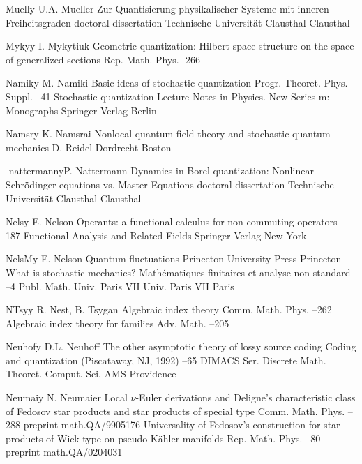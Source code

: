 \documentclass[11pt]{amsart}
\numberwithin{equation}{section}
\theoremstyle{remark}
\newcommand{\by}{\mathbf y}
\begin{document}
\begin{thebibliography}{199}
 Muell\by{ U.A. Mueller \book Zur Quantisierung physikalischer Systeme
mit inneren Freiheitsgraden \bookinfo doctoral dissertation \publ Technische
Universit\"at Clausthal \publaddr Clausthal }

 Myky\by{ I. Mykytiuk \paper Geometric quantization: Hilbert space
structure on the space of generalized sections \jour Rep. Math. Phys. 
 -266}

 Namik\by{ M. Namiki \paper Basic ideas of stochastic quantization \jour
Progr. Theoret. Phys. Suppl.   --41 \moreref \book
Stochastic quantization \bookinfo Lecture Notes in Physics. New Series m:
Monographs  \publ Springer-Verlag \publaddr Berlin }

 Namsr\by{ K. Namsrai \book Nonlocal quantum field theory and stochastic
quantum mechanics \publ D. Reidel \publaddr Dordrecht-Boston }

 -nattermann\by{P. Nattermann \book Dynamics in Borel quantization:
Nonlinear Schr\"odinger equations vs. Master Equations \bookinfo doctoral
dissertation \publ Technische Universit\"at Clausthal \publaddr Clausthal
}

 Nels\by{ E. Nelson \paper Operants: a functional calculus for
non-commuting operators --187 \inbook Functional Analysis and Related
Fields  \publ Springer-Verlag \publaddr New York }

 NelsM\by{ E. Nelson \book Quantum fluctuations \publ Princeton University
Press \publaddr Princeton  \moreref \paper What is stochastic
mechanics? \inbook Math\'ematiques finitaires et analyse non standard --4 \bookinfo Publ. Math. Univ. Paris VII  \publ Univ. Paris VII
\publaddr Paris }

 NTsy\by{ R. Nest, B. Tsygan \paper Algebraic index theory \jour Comm.
Math. Phys.   --262 \moreref \paper Algebraic index
theory for families \jour Adv. Math.   --205}

 Neuhof\by{ D.L. Neuhoff \paper The other asymptotic theory of lossy
source coding \inbook Coding and quantization (Piscataway, NJ, 1992) --65 \bookinfo DIMACS Ser. Discrete Math. Theoret. Comput. Sci.  \publ
AMS \publaddr Providence }

 Neumai\by{ N. Neumaier \paper Local $\nu$-Euler derivations and Deligne's
characteristic class of Fedosov star products and star products of special type
\jour Comm. Math. Phys.   --288 \paperinfo preprint
math.QA/9905176 \moreref \paper Universality of Fedosov's construction for star
products of Wick type on pseudo-K\"ahler manifolds \jour Rep. Math. Phys.   --80 \paperinfo preprint math.QA/0204031}


\end{thebibliography}
\end{document}
